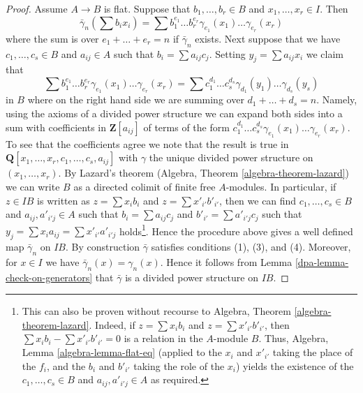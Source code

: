 \begin{proof}
\medskip\noindent
Assume $A \to B$ is flat. Suppose that $b_1, \ldots, b_r \in B$ and
$x_1, \ldots, x_r \in I$. Then
$$
\bar\gamma_n(\sum b_ix_i) =
\sum b_1^{e_1} \ldots b_r^{e_r} \gamma_{e_1}(x_1) \ldots \gamma_{e_r}(x_r)
$$
where the sum is over $e_1 + \ldots + e_r = n$
if $\bar\gamma_n$ exists. Next suppose that we have $c_1, \ldots, c_s \in B$
and $a_{ij} \in A$ such that $b_i = \sum a_{ij}c_j$.
Setting $y_j = \sum a_{ij}x_i$ we claim that
$$
\sum b_1^{e_1} \ldots b_r^{e_r} \gamma_{e_1}(x_1) \ldots \gamma_{e_r}(x_r) =
\sum c_1^{d_1} \ldots c_s^{d_s} \gamma_{d_1}(y_1) \ldots \gamma_{d_s}(y_s)
$$
in $B$ where on the right hand side we are summing over
$d_1 + \ldots + d_s = n$. Namely, using the axioms of a divided power
structure we can expand both sides into a sum with coefficients
in $\mathbf{Z}[a_{ij}]$ of terms of the form
$c_1^{d_1} \ldots c_s^{d_s}\gamma_{e_1}(x_1) \ldots \gamma_{e_r}(x_r)$.
To see that the coefficients agree we note that the result is true
in $\mathbf{Q}[x_1, \ldots, x_r, c_1, \ldots, c_s, a_{ij}]$ with
$\gamma$ the unique divided power structure on $(x_1, \ldots, x_r)$.
By Lazard's theorem (Algebra, Theorem \ref{algebra-theorem-lazard})
we can write $B$ as a directed colimit of finite free $A$-modules.
In particular, if $z \in IB$ is written as $z = \sum x_ib_i$ and
$z = \sum x'_{i'}b'_{i'}$, then we can find $c_1, \ldots, c_s \in B$
and $a_{ij}, a'_{i'j} \in A$ such that $b_i = \sum a_{ij}c_j$
and $b'_{i'} = \sum a'_{i'j}c_j$ such that
$y_j = \sum x_ia_{ij} = \sum x'_{i'}a'_{i'j}$ holds\footnote{This
can also be proven without recourse to
Algebra, Theorem \ref{algebra-theorem-lazard}. Indeed, if
$z = \sum x_ib_i$ and $z = \sum x'_{i'}b'_{i'}$, then
$\sum x_ib_i - \sum x'_{i'}b'_{i'} = 0$ is a relation in the
$A$-module $B$. Thus, Algebra, Lemma \ref{algebra-lemma-flat-eq}
(applied to the $x_i$ and $x'_{i'}$ taking the place of the $f_i$,
and the $b_i$ and $b'_{i'}$ taking the role of the $x_i$) yields
the existence of the $c_1, \ldots, c_s \in B$
and $a_{ij}, a'_{i'j} \in A$ as required.}.
Hence the procedure above gives a well defined map $\bar\gamma_n$
on $IB$. By construction $\bar\gamma$ satisfies conditions (1), (3), and
(4). Moreover, for $x \in I$ we have $\bar\gamma_n(x) = \gamma_n(x)$. Hence
it follows from Lemma \ref{dpa-lemma-check-on-generators} that $\bar\gamma$
is a divided power structure on $IB$.
\end{proof}

